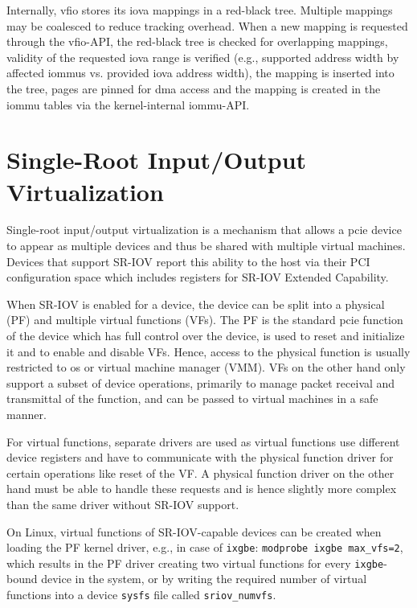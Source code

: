 Internally, \ac{vfio} stores its \ac{iova} mappings in a red-black tree.
Multiple mappings may be coalesced to reduce tracking overhead. When a new
mapping is requested through the \ac{vfio}-API, the red-black tree is checked
for overlapping mappings, validity of the requested \ac{iova} range is verified
(e.g., supported address width by affected \acp{iommu} vs. provided \ac{iova}
address width), the mapping is inserted into the tree, pages are pinned for
\ac{dma} access and the mapping is created in the \ac{iommu} tables via the
kernel-internal \ac{iommu}-API.


\section{Single-Root Input/Output Virtualization}
\label{sec:sriov}

Single-root input/output virtualization is a mechanism that allows a \ac{pcie}
device to appear as multiple devices and thus be shared with multiple virtual
machines. Devices that support SR-IOV report this ability to the host via their
PCI configuration space which includes registers for SR-IOV Extended Capability.

When SR-IOV is enabled for a device, the device can be split into a physical
(PF) and multiple virtual functions (VFs). The PF is the standard \ac{pcie}
function of the device which has full control over the device, is used to reset
and initialize it and to enable and disable VFs. Hence, access to the physical
function is usually restricted to \ac{os} or virtual machine manager (VMM). VFs
on the other hand only support a subset of device operations, primarily to
manage packet receival and transmittal of the function, and can be passed to
virtual machines in a safe manner.

For virtual functions, separate drivers are used as virtual functions use
different device registers and have to communicate with the physical function
driver for certain operations like reset of the VF. A physical function driver
on the other hand must be able to handle these requests and is hence slightly
more complex than the same driver without SR-IOV support.

On Linux, virtual functions of SR-IOV-capable devices can be created when
loading the PF kernel driver, e.g., in case of \texttt{ixgbe}: \texttt{modprobe
ixgbe max\_vfs=2}, which results in the PF driver creating two virtual functions
for every \texttt{ixgbe}-bound device in the system, or by writing the required
number of virtual functions into a device \texttt{sysfs} file called
\texttt{sriov\_numvfs}.

